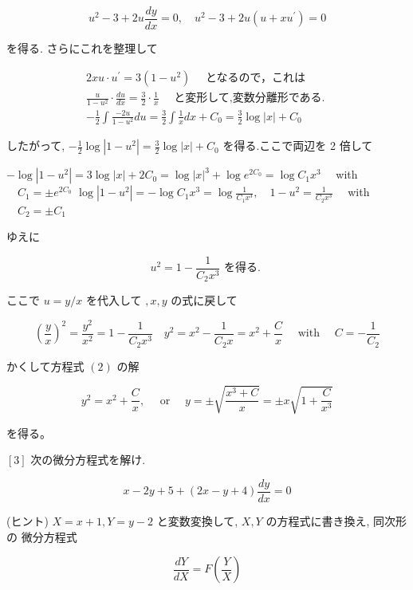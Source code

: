 \documentclass[10pt]{article}
\begin{document}
$$
u^{2}-3+2 u \frac{d y}{d x}=0, \quad u^{2}-3+2 u\left(u+x u^{\prime}\right)=0
$$

を得る. さらにこれを整理して

$$
\begin{gathered}
2 x u \cdot u^{\prime}=3\left(1-u^{2}\right) \quad \text { となるので，これは } \\
\frac{u}{1-u^{2}} \cdot \frac{d u}{d x}=\frac{3}{2} \cdot \frac{1}{x} \quad \text { と変形して,変数分離形である. } \\
-\frac{1}{2} \int \frac{-2 u}{1-u^{2}} d u=\frac{3}{2} \int \frac{1}{x} d x+C_{0}=\frac{3}{2} \log |x|+C_{0}
\end{gathered}
$$

したがって, $-\frac{1}{2} \log \left|1-u^{2}\right|=\frac{3}{2} \log |x|+C_{0}$ を得る.ここで両辺を 2 倍して

$-\log \left|1-u^{2}\right|=3 \log |x|+2 C_{0}=\log |x|^{3}+\log e^{2 C_{0}}=\log C_{1} x^{3} \quad$ with $\quad C_{1}= \pm e^{2 C_{0}}$ $\log \left|1-u^{2}\right|=-\log C_{1} x^{3}=\log \frac{1}{C_{1} x^{3}}, \quad 1-u^{2}=\frac{1}{C_{2} x^{3}} \quad$ with $\quad C_{2}= \pm C_{1}$

ゆえに


\begin{equation*}
u^{2}=1-\frac{1}{C_{2} x^{3}} \text { を得る. } \tag{*3}
\end{equation*}


ここで $u=y / x$ を代入して $, x, y$ の式に戻して

$$
\left(\frac{y}{x}\right)^{2}=\frac{y^{2}}{x^{2}}=1-\frac{1}{C_{2} x^{3}} \quad y^{2}=x^{2}-\frac{1}{C_{2} x}=x^{2}+\frac{C}{x} \quad \text { with } \quad C=-\frac{1}{C_{2}}
$$

かくして方程式 $(2)$ の解

$$
y^{2}=x^{2}+\frac{C}{x}, \quad \text { or } \quad y= \pm \sqrt{\frac{x^{3}+C}{x}}= \pm x \sqrt{1+\frac{C}{x^{3}}}
$$

を得る。

$[3]$ 次の微分方程式を解け.


\begin{equation*}
x-2 y+5+(2 x-y+4) \frac{d y}{d x}=0 \tag{3}
\end{equation*}


(ヒント) $X=x+1, Y=y-2$ と変数変換して, $X, Y$ の方程式に書き換え, 同次形の 微分方程式


\begin{equation*}
\frac{d Y}{d X}=F\left(\frac{Y}{X}\right) \tag{4}
\end{equation*}
\end{document}
